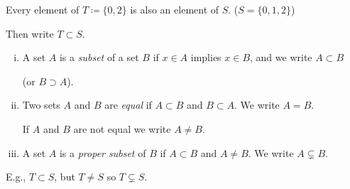 \documentclass[10pt,aspectratio=169]{beamer}
\begin{document}
\begin{frame}
Every element of $T \coloneqq \{ 0 , 2 \}$ is also an element of $S$.
\quad($S=\{0,1,2\}$)

\medskip
\pause

Then write $T \subset S$.

\hspace*{1.6in}{sets.pdf_t}

\pause

\begin{definition}
\leavevmode
\begin{enumerate}[(i)]
\item
A set $A$ is a \emph{subset}
of a set $B$ if $x \in A$ implies $x \in B$, and we write $A \subset B$

(or
$B \supset A$).
\item \pause
Two sets $A$ and $B$ are \emph{equal} if $A \subset B$ and $B
\subset A$.  We write $A = B$.

If $A$ and $B$ are not equal we write $A \not= B$.
\item \pause
A set $A$ is a \emph{proper subset} of $B$ if $A \subset B$
and $A \not= B$.  We write $A \subsetneq B$.
\end{enumerate}
\end{definition}

\pause
E.g., $T \subset S$, but $T \not= S$ so $T \subsetneq S$.
\end{frame}
\end{document}
